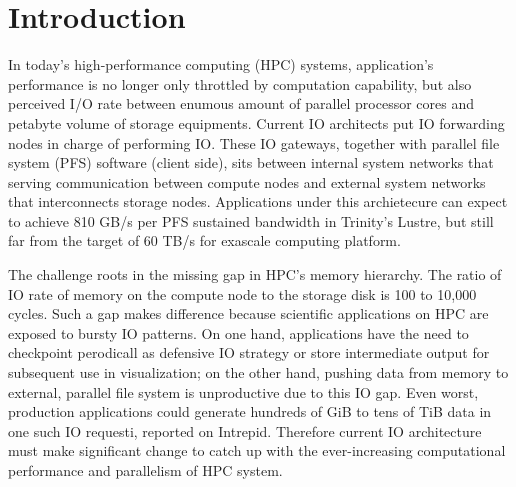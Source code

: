 \section{Introduction}

In today's high-performance computing (HPC) systems, application's performance
is no longer only throttled by computation capability, but also perceived I/O rate between
enumous amount of parallel processor cores and petabyte volume of storage equipments.
Current IO architects put IO forwarding nodes in charge of performing IO.
These IO gateways, together with parallel file system (PFS) software (client side), sits
between internal system networks that serving communication between compute nodes
and external system networks that interconnects storage nodes\cite{Ross:IOSystem}.
Applications under this archietecure can expect to achieve
810 GB/s per PFS sustained bandwidth in Trinity's Lustre\cite{TrinitySystem},
but still far from the target of 60 TB/s for exascale computing platform\cite{Shalf:HPCCS:2010}.


The challenge roots in the missing gap in HPC's memory hierarchy.
The ratio of IO rate of memory on the compute node to the storage disk
is 100 to 10,000 cycles\cite{TrinitySystem}.
Such a gap makes difference because scientific applications on HPC are exposed to
bursty IO patterns\cite{Carns:MSST:2011, Kim:PDSW:2010}.
On one hand, applications have the need to checkpoint perodicall as
defensive IO strategy\cite{Latham:CSD:2012, Naik:ICPPW:2009, Dennis:CUG:2009}
or store intermediate output for subsequent use in visualization;
on the other hand, pushing data from memory to external, parallel file system is
unproductive due to this IO gap.
Even worst, production applications could generate hundreds of GiB to tens of TiB data
in one such IO requesti, reported on Intrepid\cite{Liu:MSST:2012}.
Therefore current IO architecture must make significant change to catch up with
the ever-increasing computational performance and parallelism of HPC system.


